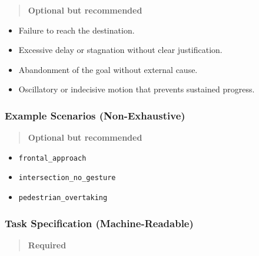 \documentclass[utf8]{frontiers_suppmat} %
\providecommand{\tightlist}{%
  \setlength{\itemsep}{0pt}\setlength{\parskip}{0pt}}
\begin{document}
\begin{quote}
\textbf{Optional but recommended}
\end{quote}

\begin{itemize}
\tightlist
\item
  Failure to reach the destination.
\item
  Excessive delay or stagnation without clear justification.
\item
  Abandonment of the goal without external cause.
\item
  Oscillatory or indecisive motion that prevents sustained progress.
\end{itemize}

\subsubsection{Example Scenarios
(Non-Exhaustive)}\label{example-scenarios-non-exhaustive}

\begin{quote}
\textbf{Optional but recommended}
\end{quote}

\begin{itemize}
\tightlist
\item
  \texttt{frontal\_approach}
\item
  \texttt{intersection\_no\_gesture}
\item
  \texttt{pedestrian\_overtaking}
\end{itemize}

\subsubsection{Task Specification
(Machine-Readable)}\label{task-specification-machine-readable}

\begin{quote}
\textbf{Required}
\end{quote}
\end{document}
